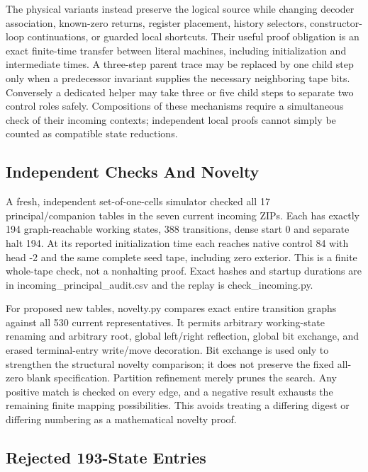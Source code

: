 The physical variants instead preserve the logical source while changing decoder association, known-zero returns, register placement, history selectors, constructor-loop continuations, or guarded local shortcuts. Their useful proof obligation is an exact finite-time transfer between literal machines, including initialization and intermediate times. A three-step parent trace may be replaced by one child step only when a predecessor invariant supplies the necessary neighboring tape bits. Conversely a dedicated helper may take three or five child steps to separate two control roles safely. Compositions of these mechanisms require a simultaneous check of their incoming contexts; independent local proofs cannot simply be counted as compatible state reductions.

\subsection{Independent Checks And Novelty}

A fresh, independent set-of-one-cells simulator checked all 17 principal/companion tables in the seven current incoming ZIPs. Each has exactly 194 graph-reachable working states, 388 transitions, dense start 0 and separate halt 194. At its reported initialization time each reaches native control 84 with head -2 and the same complete seed tape, including zero exterior. This is a finite whole-tape check, not a nonhalting proof. Exact hashes and startup durations are in incoming\_principal\_audit.csv and the replay is check\_incoming.py.

For proposed new tables, novelty.py compares exact entire transition graphs against all 530 current representatives. It permits arbitrary working-state renaming and arbitrary root, global left/right reflection, global bit exchange, and erased terminal-entry write/move decoration. Bit exchange is used only to strengthen the structural novelty comparison; it does not preserve the fixed all-zero blank specification. Partition refinement merely prunes the search. Any positive match is checked on every edge, and a negative result exhausts the remaining finite mapping possibilities. This avoids treating a differing digest or differing numbering as a mathematical novelty proof.

\subsection{Rejected 193-State Entries}

